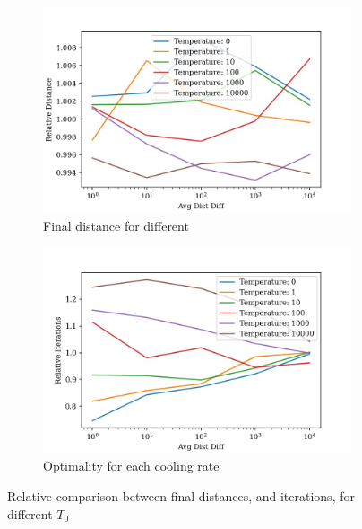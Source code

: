 \documentclass{article}
\begin{document}
\begin{figure}[H]
    \centering
    \begin{subfigure}{0.45\textwidth}
        \centering
        \includegraphics[width=1\linewidth]{images/rand_temperature_avg_dist_diff_distance_relative.jpg}
        \caption{Final distance for different }
        \label{fig:sub1}
    \end{subfigure}%
    \begin{subfigure}{0.45\textwidth}
        \centering
        \includegraphics[width=1\linewidth]{images/rand_temperature_avg_dist_diff_iterations_relative.jpg}
        \caption{Optimality for each cooling rate}
        \label{fig:sub2}
    \end{subfigure}
    \captionsetup{justification=centering}
    \caption{Relative comparison between final distances, and iterations, for different $T_0$}
\end{figure}
\end{document}
